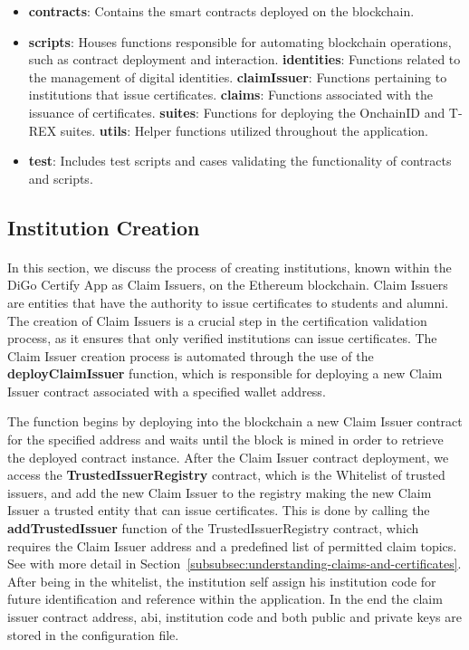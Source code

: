 \begin{itemize}
    \item \textbf{contracts}: Contains the smart contracts deployed on the blockchain.
    \item \textbf{scripts}: Houses functions responsible for automating blockchain operations, such as contract deployment and interaction.
          \subitem\textbf{identities}: Functions related to the management of digital identities.
          \subitem\textbf{claimIssuer}: Functions pertaining to institutions that issue certificates.
          \subitem\textbf{claims}: Functions associated with the issuance of certificates.
          \subitem\textbf{suites}: Functions for deploying the OnchainID and T-REX suites.
          \subitem\textbf{utils}: Helper functions utilized throughout the application.
    \item \textbf{test}: Includes test scripts and cases validating the functionality of contracts and scripts.
\end{itemize}

\subsection{Institution Creation}\label{subsec:creating-institutions}
\paragraph{}

In this section, we discuss the process of creating institutions, known within the DiGo Certify App as Claim Issuers, on the Ethereum blockchain.
Claim Issuers are entities that have the authority to issue certificates to students and alumni. The creation of Claim Issuers is a crucial step in the certification validation process, as it ensures that only verified institutions can issue certificates.
The Claim Issuer creation process is automated through the use of the \textbf{deployClaimIssuer} function, which is responsible for deploying a new Claim Issuer contract associated with a specified wallet address.

The function begins by deploying into the blockchain a new Claim Issuer contract for the specified address and waits until the block is mined in order to retrieve the deployed contract instance.
After the Claim Issuer contract deployment, we access the \textbf{TrustedIssuerRegistry} contract, which is the Whitelist of trusted issuers, and add the new Claim Issuer to the registry making the new
Claim Issuer a trusted entity that can issue certificates. This is done by calling the \textbf{addTrustedIssuer} function of the TrustedIssuerRegistry contract, which requires the Claim Issuer address and a predefined list of permitted claim topics. See with more detail in Section~\ref{subsubsec:understanding-claims-and-certificates}.
After being in the whitelist, the institution self assign his institution code for future identification and reference within the application.
In the end the claim issuer contract address, abi, institution code and both public and private keys are stored in the configuration file.

